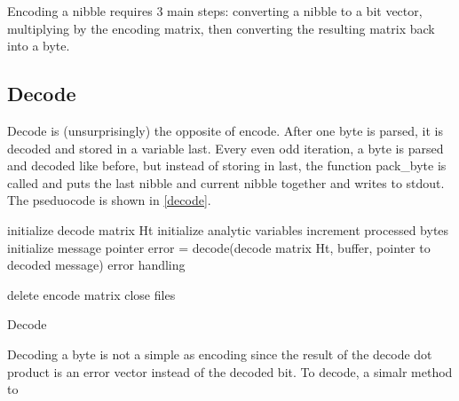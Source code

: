 \documentclass[12pt]{article}
\begin{document}
Encoding a nibble requires 3 main steps: converting a nibble to a bit
vector, multiplying by the encoding matrix, then converting the resulting
matrix back into a byte.

\subsection{Decode}

Decode is (unsurprisingly) the opposite of encode. After one byte is
parsed, it is decoded and stored in a variable last.
Every even odd iteration, a byte is parsed and decoded like before,
but instead of storing in last, the function pack\_byte is called
and puts the last nibble and current nibble together and writes to
stdout.
The pseduocode is shown in \vref{decode}.

\begin{algorithm}
    initialize decode matrix Ht\;
    initialize analytic variables\;
     {
        increment processed bytes\;
        initialize message pointer\;
        error = decode(decode matrix Ht, buffer, pointer to decoded message)\;
		error handling\;
        \vspace{0.4em}
    }

    delete encode matrix\;
    close files\;
    \caption{Decode}\label{decode}
\end{algorithm}

Decoding a byte is not a simple as encoding since the result of the decode
dot product is an error vector instead of the decoded bit. To decode, a simalr
method to 
\end{document}
